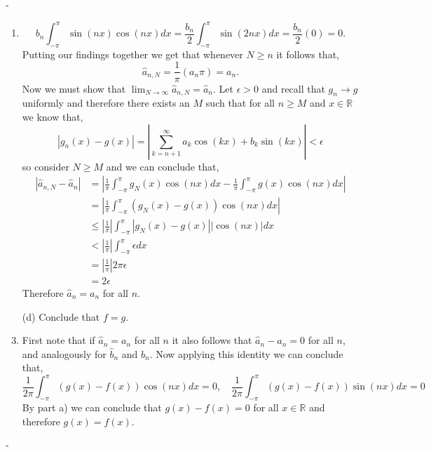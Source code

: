 \documentclass[12pt]{article}
\makeatletter
\theoremstyle{ex215}
\newcounter{probcount}
\newlength\probsep
\newlength\pshrinking
\newenvironment{problems}%
  {\ifhmode\unskip\par\fi\setcounter{probcount}{0}\probsep\parskip
  \sbox\@tempboxa{\textbf{9.}}\pshrinking\wd\@tempboxa\advance\pshrinking\labelsep
  \advance\linewidth -\pshrinking
  \advance\@totalleftmargin\pshrinking
  \advance\leftskip\pshrinking}%
  {\ifhmode\unskip \par\fi\advance\leftskip-\pshrinking}%
\renewenvironment{proof}[1][\proofname]{\par
  \pushQED{\qed}%
  \normalfont \topsep6\p@\@plus6\p@\relax
  \trivlist
  \@topsep \topsep
  \item[\hskip\labelsep
        \itshape
    #1\@addpunct{.}]\ignorespaces
}{%
  \popQED\endtrivlist\@endpefalse
}
\newcommand{\Reals}{\ensuremath{\mathbb R}}
\newcommand{\abs}[1]{\left| #1 \right|}
\let\RR\Reals
\makeatother
\begin{document}
\begin{problems}
\begin{enumerate}
\begin{proof}
    \begin{equation*}
      b_n \int_{-\pi}^{\pi} \sin(nx)\cos(nx)dx = \frac{b_n}{2}\int_{-\pi}^{\pi} \sin(2nx)dx =   \frac{b_n}{2}(0) = 0.
    \end{equation*}
    Putting our findings together we get that whenever $N \geq n$ it follows that, 
    \begin{equation*}
      \hat{a}_{n, N} = \frac{1}{\pi}\left(a_n\pi\right) = a_n. 
    \end{equation*}
    Now we must show that $\lim_{N \to \infty}\hat{a}_{n, N} = \hat{a}_n$. Let $\epsilon > 0$ and recall that $g_n \to g$ uniformly and therefore there exists an $M$ such that for all $n \geq M$ and $x \in \RR$ we know that, 
    \begin{equation*}
      \abs{g_n(x) - g(x)} = \abs{\sum_{k = n + 1}^\infty a_k\cos(kx) + b_k\sin(kx)} < \epsilon
    \end{equation*}
    so consider $N \geq M$ and we can conclude that, 
    \begin{align*}
      \abs{\hat{a}_{n, N} - \hat{a}_{n} } &= \abs{\frac{1}{\pi}\int_{-\pi}^{\pi} g_N(x) \cos(nx) dx - \frac{1}{\pi}\int_{-\pi}^{\pi} g(x) \cos(nx) dx}\\
      &= \abs{\frac{1}{\pi}\int_{-\pi}^{\pi} \left(g_N(x) - g(x)\right) \cos(nx) dx}\\
      &\leq \abs{\frac{1}{\pi}}\int_{-\pi}^{\pi} \abs{g_N(x) - g(x)} \abs{\cos(nx)}dx\\
      &< \abs{\frac{1}{\pi}}\int_{-\pi}^{\pi} \epsilon dx\\
      &= \abs{\frac{1}{\pi}}{2\pi}\epsilon\\
      &= 2\epsilon
    \end{align*}
    Therefore $\hat{a}_n =a_n$ for all $n$. 
  \end{proof}


  \item[(d)] Conclude that $f = g$. 

  \begin{proof} First note that if $\hat{a}_n = a_n$ for all $n$ it also follows that $\hat{a}_{n} - a_n = 0$ for all $n$, and analogously for $\hat{b}_{n}$ and $b_n$. Now applying this identity we can conclude that, 
    \begin{equation*}
      \frac{1}{2\pi}\int_{-\pi}^{\pi} (g(x)-f(x)) \cos(nx) dx = 0, \quad \frac{1}{2\pi}\int_{-\pi}^{\pi} (g(x)-f(x)) \sin(nx) dx = 0
    \end{equation*}
    By part a) we can conclude that $g(x) - f(x) = 0$ for all $x \in \RR$ and therefore $g(x) = f(x)$.
   \end{proof}





\end{enumerate}
\end{problems}
\end{document}
